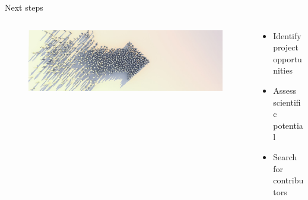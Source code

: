 \documentclass[aspectratio=169]{beamer}
\begin{document}
\begin{frame}{Next steps}
    \begin{columns}[b]
        \begin{column}{0.3\textwidth}
            \begin{figure}[H]
                \centering
                \includegraphics[width=\textwidth]{./tex_images/next_steps.jpg}
            \end{figure}
        \end{column}
        \begin{column}{0.65\textwidth}
            \vspace*{0.5cm}
            \begin{itemize}
                \item Identify project opportunities
                \item Assess scientific potential
                \item Search for contributors
            \end{itemize}
        \end{column}
    \end{columns}
    \vspace*{1cm}
    \pause


\end{frame}
\end{document}
